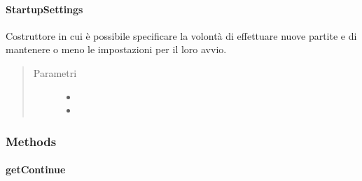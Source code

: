 \documentclass[letterpaper,10pt,italian,openany,oneside]{sphinxmanual}
\begin{document}
\paragraph{StartupSettings}
\label{\detokenize{source/it/unicam/cs/pa/mastermind/gamecore/StartupSettings:id2}}

\begin{fulllineitems}
\label{\detokenize{source/it/unicam/cs/pa/mastermind/gamecore/StartupSettings:it.unicam.cs.pa.mastermind.gamecore.StartupSettings.StartupSettings(boolean, boolean)}}
Costruttore in cui è possibile specificare la volontà di effettuare nuove partite e di mantenere o meno le impostazioni per il loro avvio.
\begin{quote}\begin{description}
\item[{Parametri}] \leavevmode\begin{itemize}
\item {} 
 \textendash{} 

\item {} 
 \textendash{} 

\end{itemize}

\end{description}\end{quote}

\end{fulllineitems}



\subsubsection{Methods}
\label{\detokenize{source/it/unicam/cs/pa/mastermind/gamecore/StartupSettings:methods}}

\paragraph{getContinue}
\label{\detokenize{source/it/unicam/cs/pa/mastermind/gamecore/StartupSettings:getcontinue}}
\end{document}
